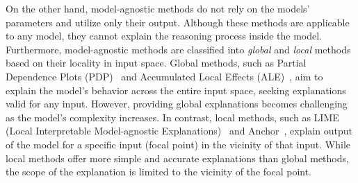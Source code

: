 \documentclass[11pt]{article}
\begin{document}
On the other hand,
model-agnostic methods
do not rely on the models' parameters and utilize only their output.
Although these methods are applicable to any model,
they cannot explain the reasoning process inside the model.
Furthermore, model-agnostic methods are classified into
\emph{global} and \emph{local} methods based on their locality in input space.
Global methods,
such as Partial Dependence Plots (PDP)~\cite{friedman2001greedy}
and Accumulated Local Effects (ALE)~\cite{apley2020visualizing},
aim to explain the model's behavior across the entire input space,
seeking explanations valid for any input.
However, providing global explanations becomes challenging
as the model's complexity increases.
In contrast, local methods,
such as LIME (Local Interpretable Model-agnostic Explanations)~\cite{ribeiro2016why}
and Anchor~\cite{ribeiro2018anchors},
explain output of the model for a specific input
(focal point) in the vicinity of that input.
While local methods offer more simple and accurate explanations
than global methods,
the scope of the explanation is limited to the vicinity of the focal point.
\end{document}
